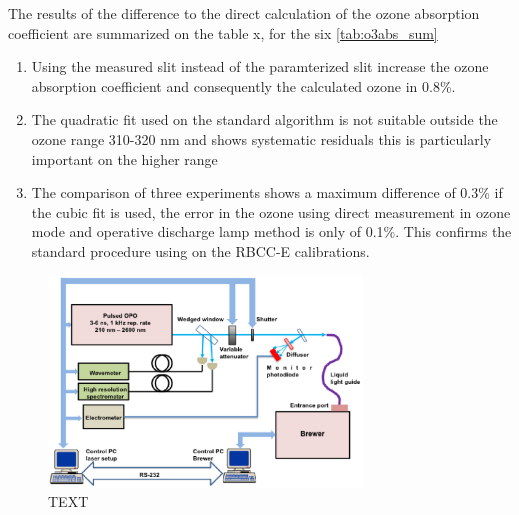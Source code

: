 \documentclass[acp]{copernicus} %
\begin{document}
The results of the difference to the direct calculation of the ozone absorption coefficient are summarized on the table x, for the six \ref{tab:o3abs_sum}




\conclusions{}

\begin{enumerate}


    \item Using the measured slit instead of the paramterized slit increase the ozone absorption coefficient and consequently the calculated ozone in 0.8\%.

    \item The quadratic fit used on the standard algorithm is not suitable outside the ozone range 310-320 nm and shows systematic residuals this is particularly important on the higher range%

    \item The comparison of three experiments shows a  maximum difference of 0.3\% if the cubic fit is used, the error in the ozone using direct measurement in ozone mode and operative discharge lamp method is only of 0.1\%. This confirms the standard procedure using on the RBCC-E calibrations.

\end{enumerate}





\begin{figure}[t]
\includegraphics[width=8.3cm]{figures/opo.eps}
\caption{TEXT}
\label{fig:opo}
\end{figure}
\end{document}
